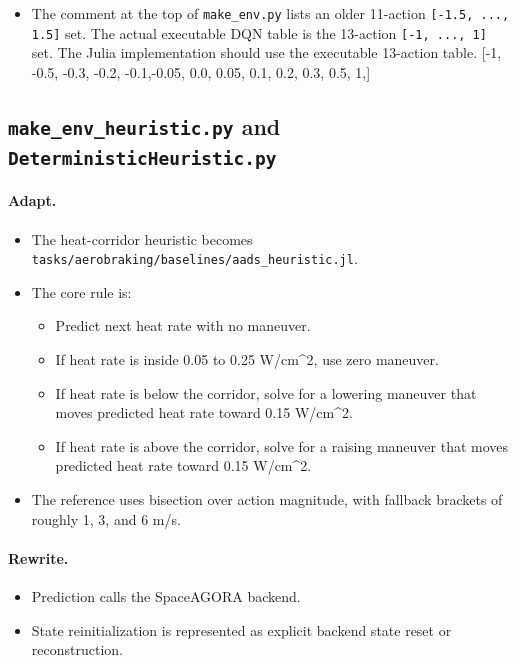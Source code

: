 \documentclass[11pt]{article}
\begin{document}
\begin{itemize}
\item The comment at the top of \texttt{make\_env.py} lists an older 11-action \texttt{[-1.5, ..., 1.5]} set. The actual executable DQN table is the 13-action \texttt{[-1, ..., 1]} set. The Julia implementation should use the executable 13-action table. [-1, -0.5, -0.3, -0.2, -0.1,-0.05, 0.0, 0.05, 0.1, 0.2, 0.3, 0.5, 1,] 
\end{itemize}


\subsection{\texttt{make\_env\_heuristic.py} and \texttt{DeterministicHeuristic.py}}

\paragraph{Adapt.}

\begin{itemize}
\item The heat-corridor heuristic becomes \texttt{tasks/aerobraking/baselines/aads\_heuristic.jl}.
\item The core rule is:
\begin{itemize}
\item Predict next heat rate with no maneuver.
\item If heat rate is inside 0.05 to 0.25 W/cm\textasciicircum{}2, use zero maneuver.
\item If heat rate is below the corridor, solve for a lowering maneuver that moves predicted heat rate toward 0.15 W/cm\textasciicircum{}2.
\item If heat rate is above the corridor, solve for a raising maneuver that moves predicted heat rate toward 0.15 W/cm\textasciicircum{}2.
\end{itemize}
\item The reference uses bisection over action magnitude, with fallback brackets of roughly 1, 3, and 6 m/s.
\end{itemize}

\paragraph{Rewrite.}

\begin{itemize}
\item Prediction calls the SpaceAGORA backend.
\item State reinitialization is represented as explicit backend state reset or reconstruction.
\end{itemize}
\end{document}
